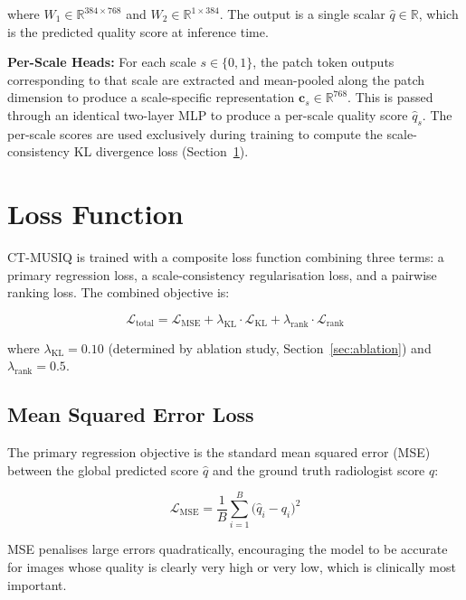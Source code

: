 where $W_1 \in \mathbb{R}^{384 \times 768}$ and $W_2 \in \mathbb{R}^{1 \times 384}$.
The output is a single scalar $\hat{q} \in \mathbb{R}$, which is the predicted quality
score at inference time.

\textbf{Per-Scale Heads:} For each scale $s \in \{0, 1\}$, the patch token outputs
corresponding to that scale are extracted and mean-pooled along the patch dimension to
produce a scale-specific representation $\mathbf{c}_s \in \mathbb{R}^{768}$. This is
passed through an identical two-layer MLP to produce a per-scale quality score
$\hat{q}_s$. The per-scale scores are used exclusively during training to compute the
scale-consistency KL divergence loss (Section~\ref{sec:loss}).


\section{Loss Function}
\label{sec:loss}

CT-MUSIQ is trained with a composite loss function combining three terms: a primary
regression loss, a scale-consistency regularisation loss, and a pairwise ranking loss.
The combined objective is:

\begin{equation}
    \mathcal{L}_{\text{total}} = \mathcal{L}_{\text{MSE}}
                               + \lambda_{\text{KL}} \cdot \mathcal{L}_{\text{KL}}
                               + \lambda_{\text{rank}} \cdot \mathcal{L}_{\text{rank}}
    \label{eq:total_loss}
\end{equation}

where $\lambda_{\text{KL}} = 0.10$ (determined by ablation study,
Section~\ref{sec:ablation}) and $\lambda_{\text{rank}} = 0.5$.

\subsection{Mean Squared Error Loss}

The primary regression objective is the standard mean squared error (MSE) between the
global predicted score $\hat{q}$ and the ground truth radiologist score $q$:

\begin{equation}
    \mathcal{L}_{\text{MSE}} = \frac{1}{B} \sum_{i=1}^{B} \bigl(\hat{q}_i - q_i\bigr)^2
\end{equation}

MSE penalises large errors quadratically, encouraging the model to be accurate for
images whose quality is clearly very high or very low, which is clinically most important.

